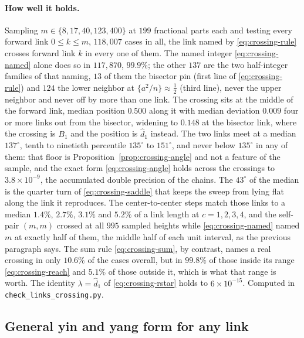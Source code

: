 \documentclass[11pt]{article}
\theoremstyle{definition}
\begin{document}
\paragraph{How well it holds.} Sampling $m\in\{8,17,40,123,400\}$ at $199$
fractional parts each and testing every forward link $0\leq k\leq m$,
$118{,}007$ cases in all, the link named by \eqref{eq:crossing-rule} crosses
forward link $k$ in every one of them. The named integer
\eqref{eq:crossing-named} alone does so in $117{,}870$, $99.9\%$; the other
$137$ are the two half-integer families of that naming, $13$ of them the
bisector pin (first line of \eqref{eq:crossing-rule}) and $124$ the lower
neighbor at $\{a^{2}/n\}\approx\tfrac12$ (third line), never the upper
neighbor and never off by more than one link. The
crossing sits at the middle of the forward link, median position $0.500$ along
it with median deviation $0.009$ four or more links out from the bisector, widening
to $0.148$ at the bisector link, where the crossing is $B_1$ and the position is
$\hat d_1$ instead. The two links meet at a median $137^{\circ}$, tenth to
ninetieth percentile $135^{\circ}$ to $151^{\circ}$, and never below
$135^{\circ}$ in any of them: that floor is
Proposition~\ref{prop:crossing-angle} and not a feature of the sample, and the
exact form \eqref{eq:crossing-angle} holds across the crossings to
$3.8\times10^{-9}$, the accumulated double precision of the chains. The
$43^{\circ}$ of the median is the quarter turn of \eqref{eq:crossing-saddle}
that keeps the sweep from lying flat along the link it reproduces. The center-to-center steps
match those links to a median $1.4\%$, $2.7\%$, $3.1\%$ and $5.2\%$ of a link
length at $c=1,2,3,4$, and the self-pair $(m,m)$ crossed at all $995$ sampled
heights while \eqref{eq:crossing-named} named $m$ at exactly half of them, the
middle half of each unit interval, as the previous paragraph says. The sum rule
\eqref{eq:crossing-sum}, by contrast, names a real crossing in only $10.6\%$ of
the cases overall, but in $99.8\%$ of those inside its range
\eqref{eq:crossing-reach} and $5.1\%$ of those outside it, which is what that
range is worth. The identity $\lambda=\hat d_1$ of \eqref{eq:crossing-rstar}
holds to $6\times10^{-15}$. Computed in \texttt{check\_links\_crossing.py}.

\subsection{General yin and yang form for any link}\label{sec:yinyang-any}
\end{document}
